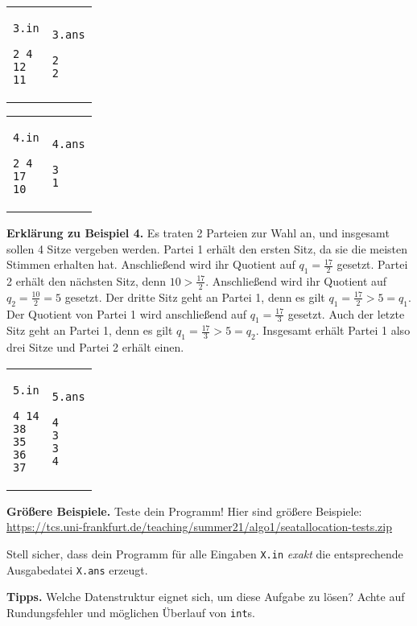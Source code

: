 \documentclass{uebung_cs}
\begin{document}
\begin{tabular}{p{}p{}}
\texttt{3.in}
\begin{verbatim}
2 4
12
11
\end{verbatim}
&
\texttt{3.ans}
\begin{verbatim}
2
2
\end{verbatim}
\end{tabular}

\begin{tabular}{p{}p{}}
\texttt{4.in}
\begin{verbatim}
2 4
17
10
\end{verbatim}
&
\texttt{4.ans}
\begin{verbatim}
3
1
\end{verbatim}
\end{tabular}

\textbf{Erklärung zu Beispiel 4.}
Es traten 2 Parteien zur Wahl an, und insgesamt sollen 4 Sitze vergeben werden.
Partei 1 erhält den ersten Sitz, da sie die meisten Stimmen erhalten hat. 
Anschließend wird ihr Quotient auf $q_1 = \frac{17}{2}$ gesetzt.
Partei 2 erhält den nächsten Sitz, denn $10 > \frac{17}{2}$.
Anschließend wird ihr Quotient auf $q_2 = \frac{10}{2} = 5$ gesetzt.
Der dritte Sitz geht an Partei 1, denn es gilt $q_1 = \frac{17}{2} > 5 = q_1$.
Der Quotient von Partei 1 wird anschließend auf $q_1 = \frac{17}{3}$ gesetzt.
Auch der letzte Sitz geht an Partei 1, denn es gilt $q_1 = \frac{17}{3} > 5 = q_2$.
Insgesamt erhält Partei 1 also drei Sitze und Partei 2 erhält einen.

\begin{tabular}{p{}p{}}
\texttt{5.in}
\begin{verbatim}
4 14
38
35
36
37
\end{verbatim}
&
\texttt{5.ans}
\begin{verbatim}
4
3
3
4
\end{verbatim}
\end{tabular}

\textbf{Größere Beispiele.}
Teste dein Programm! Hier sind größere Beispiele:
\url{https://tcs.uni-frankfurt.de/teaching/summer21/algo1/seatallocation-tests.zip}

Stell sicher, dass dein Programm für alle Eingaben \texttt{X.in} \emph{exakt} die entsprechende Ausgabedatei \texttt{X.ans} erzeugt.

\textbf{Tipps.}
Welche Datenstruktur eignet sich, um diese Aufgabe zu lösen? Achte auf Rundungsfehler und möglichen Überlauf von \texttt{int}s.
\end{document}
